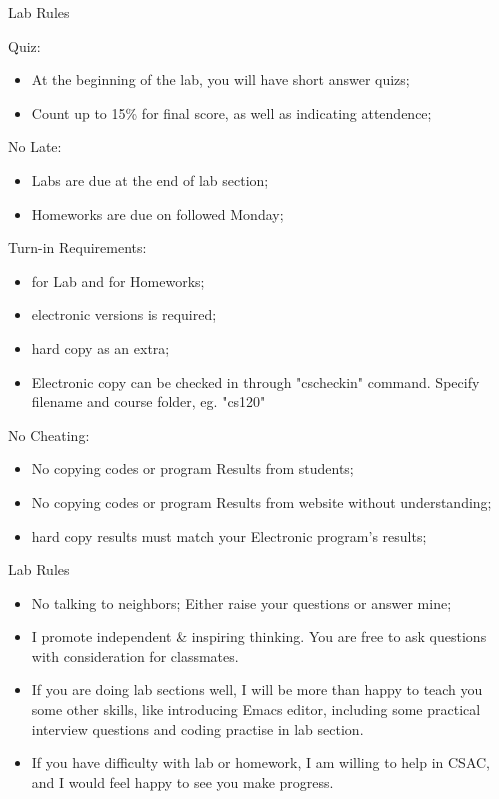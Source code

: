 \documentclass[presentation]{beamer}
\begin{document}
\begin{frame}[label=sec-2]{Lab Rules}
\begin{block}{\alert{Quiz}:}
\begin{itemize}
\item At the beginning of the lab, you will have short answer \alert{quizs};
\item Count up to 15\% for final score, as well as indicating attendence;
\end{itemize}
\end{block}
\begin{block}{\alert{No Late}:}
\begin{itemize}
\item Labs are due at the \alert{end of lab section};
\item Homeworks are due on \alert{followed Monday};
\end{itemize}
\end{block}
\begin{block}{\alert{Turn-in Requirements}:}
\begin{itemize}
\item for \alert{Lab} and for \alert{Homeworks};
\item \alert{electronic versions} is required;
\item \alert{hard copy} as an extra;
\item \alert{Electronic} copy can be checked in through "\alert{cscheckin}" command. Specify \alert{filename} and \alert{course folder}, eg. "\alert{cs120}"
\end{itemize}
\end{block}
\begin{block}{\alert{No Cheating}:}
\begin{itemize}
\item No \alert{copying} codes or program Results from students;
\item No \alert{copying} codes or program Results from website without understanding;
\item \alert{hard copy} results must \alert{match} your \alert{Electronic} program's results;
\end{itemize}
\end{block}
\end{frame}

\begin{frame}[label=sec-3]{Lab Rules}
\begin{itemize}
\item No talking to neighbors; Either raise your questions or answer mine;
\item I promote \alert{independent \& inspiring thinking}. You are free to ask questions with consideration for classmates.
\item If you are doing lab sections well, I will be more than happy to teach you some other skills, like introducing \alert{Emacs editor}, including some practical \alert{interview questions} and coding practise in lab section.
\item If you have difficulty with lab or homework, I am willing to help in CSAC, and I would feel happy to see you make progress.
\end{itemize}
\end{frame}
\end{document}
